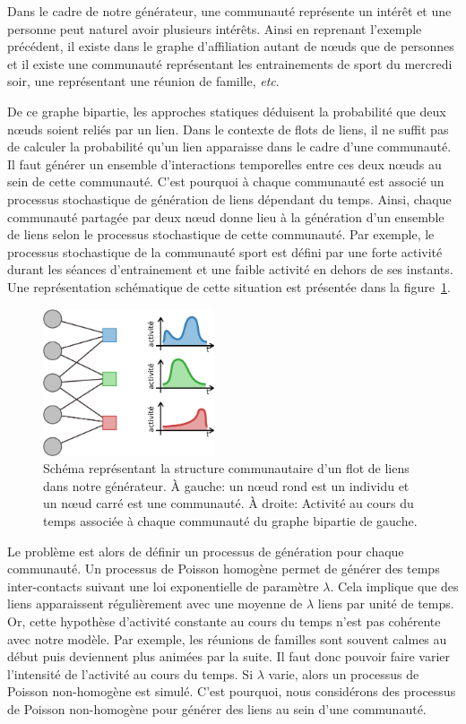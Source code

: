 Dans le cadre de notre générateur, une communauté représente un intérêt et une personne peut naturel avoir plusieurs intérêts.
Ainsi en reprenant l'exemple précédent, il existe dans le graphe d'affiliation autant de n\oe uds que de personnes et il existe une communauté représentant les entrainements de sport du mercredi soir, une représentant une réunion de famille, \emph{etc}.

De ce graphe bipartie, les approches statiques déduisent la probabilité que deux n\oe uds soient reliés par un lien.
Dans le contexte de flots de liens, il ne suffit pas de calculer la probabilité qu'un lien apparaisse dans le cadre d'une communauté.
Il faut générer un ensemble d'interactions temporelles entre ces deux n\oe uds au sein de cette communauté.
C'est pourquoi à chaque communauté est associé un processus stochastique de génération de liens dépendant du temps.
Ainsi, chaque communauté partagée par deux n\oe ud donne lieu à la génération d'un ensemble de liens selon le processus stochastique de cette communauté.
Par exemple, le processus stochastique de la communauté sport est défini par une forte activité durant les séances d'entrainement et une faible activité en dehors de ses instants.
Une représentation schématique de cette situation est présentée dans la figure~\ref{fig:qualite_Generator}.



\begin{figure}
\centering
\includegraphics[width=0.45\textwidth]{img/Qualite/Generator}
\caption{Schéma représentant la structure communautaire d'un flot de liens dans notre générateur.
\`A gauche: un n\oe ud rond est un individu et un n\oe ud carré est une communauté.
\`A droite: Activité au cours du temps associée à chaque communauté du graphe bipartie de gauche.}
\label{fig:qualite_Generator}
\end{figure}

Le problème est alors de définir un processus de génération pour chaque communauté.
Un processus de Poisson homogène permet de générer des temps inter-contacts suivant une loi exponentielle de paramètre $\lambda$.
Cela implique que des liens apparaissent régulièrement avec une moyenne de $\lambda$ liens par unité de temps.
Or, cette hypothèse d'activité constante au cours du temps n'est pas cohérente avec notre modèle.
Par exemple, les réunions de familles sont souvent calmes au début puis deviennent plus animées par la suite.
Il faut donc pouvoir faire varier l'intensité de l'activité au cours du temps.
Si $\lambda$ varie, alors un processus de Poisson non-homogène est simulé.
C'est pourquoi, nous considérons des processus de Poisson non-homogène pour générer des liens au sein d'une communauté.

